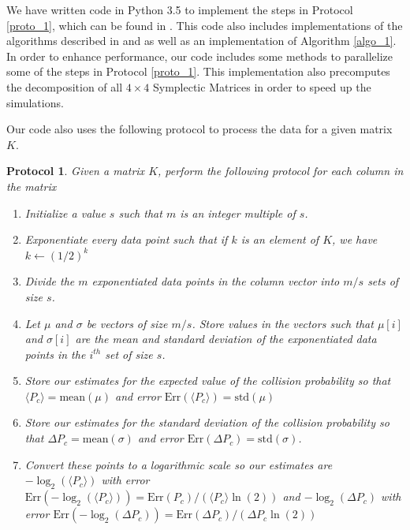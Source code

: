 \documentclass[11pt]{article}
\newtheorem{proto}{Protocol}
\theoremstyle{definition}
\theoremstyle{plain}
\begin{document}
We have written code in Python 3.5 to implement the steps in Protocol {\ref{proto_1}}, which can be found in {\cite{matthewkhoury96}}. This code also includes implementations of the algorithms described in {\cite{aaronson}} and {\cite{random_clifford}} as well as an implementation of Algorithm {\ref{algo_1}}. In order to enhance performance, our code includes some methods to parallelize some of the steps in Protocol {\ref{proto_1}}. This implementation also precomputes the decomposition of all $4 \times 4$ Symplectic Matrices in order to speed up the simulations.

Our code also uses the following protocol to process the data for a given matrix $K$.\\
\begin{proto}\label{proto_2}Given a matrix $K$, perform the following protocol for each column in the matrix
  \begin{enumerate}[label = (\arabic*)]
  \item Initialize a value $s$ such that $m$ is an integer multiple of $s$.
  \item Exponentiate every data point such that if $k$ is an element of $K$, we have $k \leftarrow {(1/2)}^{k}$ 
  \item Divide the $m$ exponentiated data points in the column vector into $m/s$ sets of size $s$.
  \item Let $\mu$ and $\sigma$ be vectors of size $m/s$. Store values in the vectors such that $\mu[i]$ and $\sigma[i]$ are the mean and standard deviation of the exponentiated data points in the $i^{th}$ set of size $s$.
  \item Store our estimates for the expected value of the collision probability so that $\langle P_c \rangle = \text{mean}(\mu)$ and error $\text{Err} (\langle P_c \rangle) = \text{std}(\mu)$
  \item Store our estimates for the standard deviation of the collision probability so that $\Delta P_c = \text{mean}(\sigma)$ and error $\text{Err} (\Delta P_c) = \text{std}(\sigma)$.
  \item Convert these points to a logarithmic scale so our estimates are $-\log_2(\langle P_c \rangle)$ with error $\text{Err}(-\log_2(\langle P_c \rangle)) = \text{Err}(P_c)/(\langle P_c \rangle \ln(2))$ and $-\log_2(\Delta P_c)$ with error $\text{Err}(-\log_2(\Delta P_c)) = \text{Err}(\Delta P_c) / (\Delta P_c \ln(2))$ 
  \end{enumerate}
\end{proto}
\end{document}
